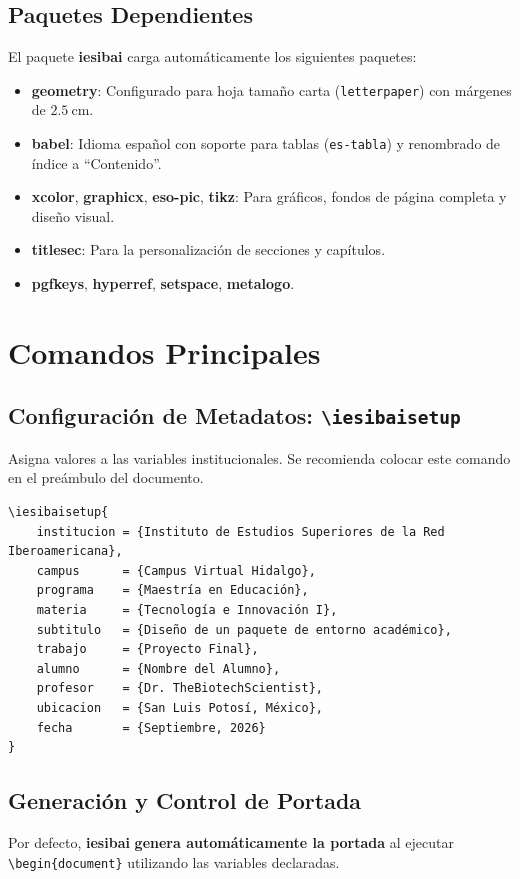 \documentclass[11pt,a4paper]{article}
\newcommand{\pkg}[1]{\textbf{#1}}
\newcommand{\cmd}[1]{\texttt{\textbackslash#1}}
\begin{document}
\subsection{Paquetes Dependientes}
El paquete \pkg{iesibai} carga automáticamente los siguientes paquetes:
\begin{itemize}
    \item \pkg{geometry}: Configurado para hoja tamaño carta (\texttt{letterpaper}) con márgenes de $2.5\ \text{cm}$.
    \item \pkg{babel}: Idioma español con soporte para tablas (\texttt{es-tabla}) y renombrado de índice a "`Contenido"'.
    \item \pkg{xcolor}, \pkg{graphicx}, \pkg{eso-pic}, \pkg{tikz}: Para gráficos, fondos de página completa y diseño visual.
    \item \pkg{titlesec}: Para la personalización de secciones y capítulos.
    \item \pkg{pgfkeys}, \pkg{hyperref}, \pkg{setspace}, \pkg{metalogo}.
\end{itemize}

\section{Comandos Principales}

\subsection{Configuración de Metadatos: \cmd{iesibaisetup}}
Asigna valores a las variables institucionales. Se recomienda colocar este comando en el preámbulo del documento.

\begin{lstlisting}
\iesibaisetup{
    institucion = {Instituto de Estudios Superiores de la Red Iberoamericana},
    campus      = {Campus Virtual Hidalgo},
    programa    = {Maestría en Educación},
    materia     = {Tecnología e Innovación I},
    subtitulo   = {Diseño de un paquete de entorno académico},
    trabajo     = {Proyecto Final},
    alumno      = {Nombre del Alumno},
    profesor    = {Dr. TheBiotechScientist},
    ubicacion   = {San Luis Potosí, México},
    fecha       = {Septiembre, 2026}
}
\end{lstlisting}

\subsection{Generación y Control de Portada}
Por defecto, \pkg{iesibai} \textbf{genera automáticamente la portada} al ejecutar \texttt{\textbackslash begin\{document\}} utilizando las variables declaradas.
\end{document}
